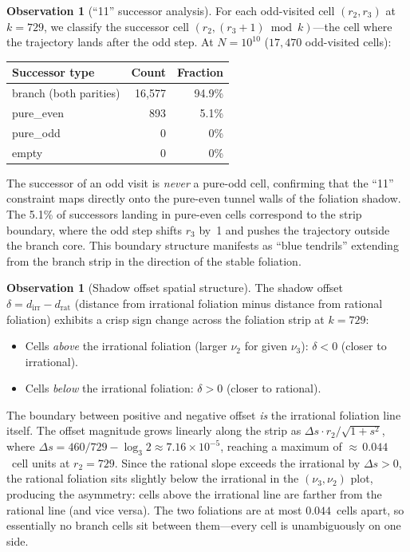 \documentclass[11pt,a4paper]{article}
\theoremstyle{plain}
\theoremstyle{definition}
\newtheorem{observation}[theorem]{Observation}
\begin{document}
\begin{observation}[``11'' successor analysis]
\label{obs:successor}
    For each odd-visited cell $(r_2, r_3)$ at $k = 729$, we classify
    the successor cell $(r_2, (r_3 + 1) \bmod k)$---the cell where
    the trajectory lands after the odd step.  At $N = 10^{10}$
    ($17{,}470$ odd-visited cells):
    \begin{center}
    \begin{tabular}{lrr}
    \toprule
    Successor type & Count & Fraction \\
    \midrule
    branch (both parities) & 16{,}577 & 94.9\% \\
    pure\_even              & 893     & 5.1\% \\
    pure\_odd               & 0       & 0\% \\
    empty                  & 0       & 0\% \\
    \bottomrule
    \end{tabular}
    \end{center}
    The successor of an odd visit is \emph{never} a pure-odd cell,
    confirming that the ``11'' constraint maps directly onto the
    pure-even tunnel walls of the foliation shadow.  The 5.1\% of
    successors landing in pure-even cells correspond to the strip
    boundary, where the odd step shifts $r_3$ by~1 and pushes the
    trajectory outside the branch core.  This boundary structure
    manifests as ``blue tendrils'' extending from the branch strip
    in the direction of the stable foliation.
\end{observation}

\begin{observation}[Shadow offset spatial structure]
\label{obs:shadow-spatial}
    The shadow offset $\delta = d_{\mathrm{irr}} - d_{\mathrm{rat}}$
    (distance from irrational foliation minus distance from rational
    foliation) exhibits a crisp sign change across the foliation strip
    at $k = 729$:
    \begin{itemize}
        \item Cells \emph{above} the irrational foliation (larger $\nu_2$
              for given $\nu_3$): $\delta < 0$ (closer to irrational).
        \item Cells \emph{below} the irrational foliation: $\delta > 0$
              (closer to rational).
    \end{itemize}
    The boundary between positive and negative offset \emph{is} the
    irrational foliation line itself.  The offset magnitude grows
    linearly along the strip as
    $\Delta s \cdot r_2 / \sqrt{1 + s^2}$,
    where $\Delta s = 460/729 - \log_3 2 \approx 7.16 \times 10^{-5}$,
    reaching a maximum of ${\approx}\,0.044$~cell units at $r_2 = 729$.
    Since the rational slope exceeds the irrational by $\Delta s > 0$,
    the rational foliation sits slightly below the irrational in
    the $(\nu_3, \nu_2)$ plot, producing the asymmetry: cells above
    the irrational line are farther from the rational line (and vice
    versa).  The two foliations are at most $0.044$~cells apart, so
    essentially no branch cells sit between them---every cell is
    unambiguously on one side.
\end{observation}
\end{document}
